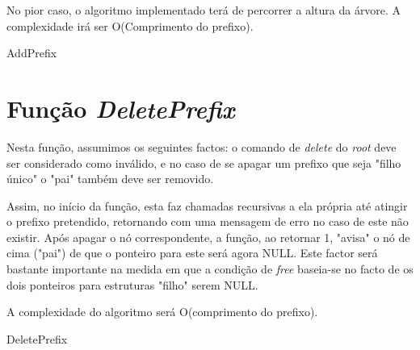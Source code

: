 \documentclass[a4paper]{article}
\begin{document}
No pior caso, o algoritmo implementado terá de percorrer a altura da árvore. A complexidade irá ser O(Comprimento do prefixo).

\begin{algorithm}[H]
 \caption{AddPrefix}
\end{algorithm}

\section{Função \textit{DeletePrefix}}
Nesta função, assumimos os seguintes factos: o comando de \textit{delete} do \textit{root} deve ser considerado como inválido, e no caso de se apagar um prefixo que seja "filho único" o "pai" também deve ser removido.

Assim, no início da função, esta faz chamadas recursivas a ela própria até atingir o prefixo pretendido, retornando com uma mensagem de erro no caso de este não existir. Após apagar o nó correspondente, a função, ao retornar 1, "avisa" o nó de cima ("pai") de que o ponteiro para este será agora NULL. Este factor será bastante importante na medida em que a condição de \textit{free} baseia-se no facto de os dois ponteiros para estruturas "filho" serem NULL.

A complexidade do algoritmo será O(comprimento do prefixo). %

\begin{algorithm}[H]
 \;
 \caption{DeletePrefix}
\end{algorithm}
\end{document}
